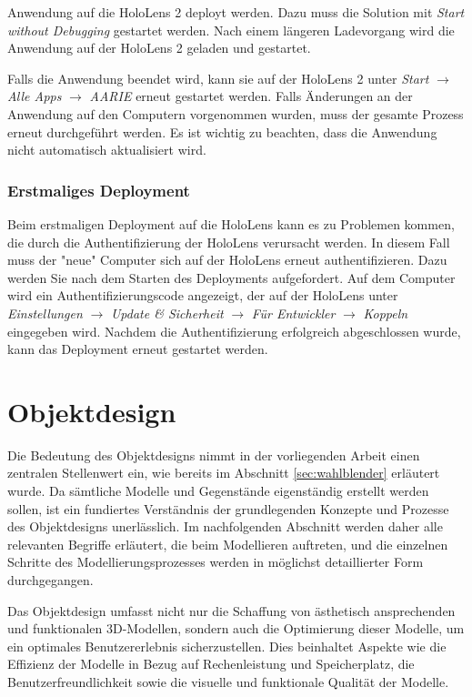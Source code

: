 Anwendung auf die HoloLens 2 deployt werden. Dazu muss die Solution mit \textit{Start without Debugging} gestartet werden. Nach einem längeren Ladevorgang wird die Anwendung auf der HoloLens 2 geladen und gestartet.

Falls die Anwendung beendet wird, kann sie auf der HoloLens 2 unter \textit{Start} $\rightarrow$ \textit{Alle Apps} $\rightarrow$ \textit{AARIE} erneut gestartet werden. Falls Änderungen an der Anwendung auf den Computern vorgenommen wurden, muss der gesamte Prozess erneut durchgeführt werden. Es ist wichtig zu beachten, dass die Anwendung nicht automatisch aktualisiert wird.

\subsubsection{Erstmaliges Deployment}
Beim erstmaligen Deployment auf die HoloLens kann es zu Problemen kommen, die durch die Authentifizierung der HoloLens verursacht werden. In diesem Fall muss der "neue" Computer sich auf der HoloLens erneut authentifizieren. Dazu werden Sie nach dem Starten des Deployments aufgefordert. Auf dem Computer wird ein Authentifizierungscode angezeigt, der auf der HoloLens unter \textit{Einstellungen} $\rightarrow$ \textit{Update \& Sicherheit} $\rightarrow$ \textit{Für Entwickler} $\rightarrow$ \textit{Koppeln} eingegeben wird. Nachdem die Authentifizierung erfolgreich abgeschlossen wurde, kann das Deployment erneut gestartet werden.


\section{Objektdesign}
Die Bedeutung des Objektdesigns nimmt in der vorliegenden Arbeit einen zentralen Stellenwert ein, wie bereits im Abschnitt \ref{sec:wahlblender} erläutert wurde. Da sämtliche Modelle und Gegenstände eigenständig erstellt werden sollen, ist ein fundiertes Verständnis der grundlegenden Konzepte und Prozesse des Objektdesigns unerlässlich. Im nachfolgenden Abschnitt werden daher alle relevanten Begriffe erläutert, die beim Modellieren auftreten, und die einzelnen Schritte des Modellierungsprozesses werden in möglichst detaillierter Form durchgegangen.

Das Objektdesign umfasst nicht nur die Schaffung von ästhetisch ansprechenden und funktionalen 3D-Modellen, sondern auch die Optimierung dieser Modelle, um ein optimales Benutzererlebnis sicherzustellen. Dies beinhaltet Aspekte wie die Effizienz der Modelle in Bezug auf Rechenleistung und Speicherplatz, die Benutzerfreundlichkeit sowie die visuelle und funktionale Qualität der Modelle.

